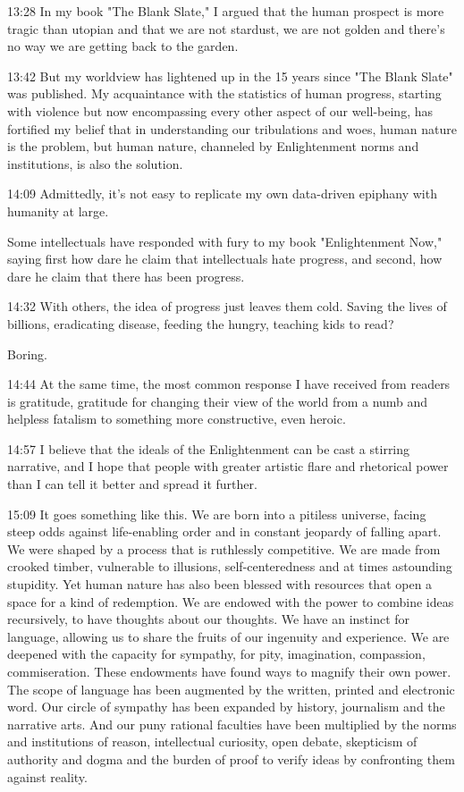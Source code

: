 \documentclass[10pt,titlepage]{book}
\begin{document}
{13:28
In my book "The Blank Slate,"
I argued that the human prospect is more tragic than utopian
and that we are not stardust, we are not golden
and there's no way we are getting back to the garden.

13:42
But my worldview has lightened up
in the 15 years since "The Blank Slate" was published.
My acquaintance with the statistics of human progress,
starting with violence
but now encompassing every other aspect of our well-being,
has fortified my belief
that in understanding our tribulations and woes,
human nature is the problem,
but human nature, channeled by Enlightenment norms and institutions,
is also the solution.

14:09
Admittedly, it's not easy to replicate my own data-driven epiphany
with humanity at large.

Some intellectuals have responded
with fury to my book "Enlightenment Now,"
saying first how dare he claim that intellectuals hate progress,
and second, how dare he claim that there has been progress.

14:32
With others, the idea of progress just leaves them cold.
Saving the lives of billions,
eradicating disease, feeding the hungry,
teaching kids to read?

Boring.

14:44
At the same time, the most common response I have received from readers is gratitude,
gratitude for changing their view of the world
from a numb and helpless fatalism
to something more constructive,
even heroic.

14:57
I believe that the ideals of the Enlightenment
can be cast a stirring narrative,
and I hope that people with greater artistic flare
and rhetorical power than I
can tell it better and spread it further.

15:09
It goes something like this.
We are born into a pitiless universe,
facing steep odds against life-enabling order
and in constant jeopardy of falling apart.
We were shaped by a process that is ruthlessly competitive.
We are made from crooked timber,
vulnerable to illusions, self-centeredness
and at times astounding stupidity.
Yet human nature has also been blessed with resources
that open a space for a kind of redemption.
We are endowed with the power to combine ideas recursively,
to have thoughts about our thoughts.
We have an instinct for language,
allowing us to share the fruits of our ingenuity and experience.
We are deepened with the capacity for sympathy,
for pity, imagination, compassion, commiseration.
These endowments have found ways to magnify their own power.
The scope of language has been augmented
by the written, printed and electronic word.
Our circle of sympathy has been expanded
by history, journalism and the narrative arts.
And our puny rational faculties have been multiplied
by the norms and institutions of reason,
intellectual curiosity, open debate,
skepticism of authority and dogma
and the burden of proof to verify ideas
by confronting them against reality.

}
\end{document}
